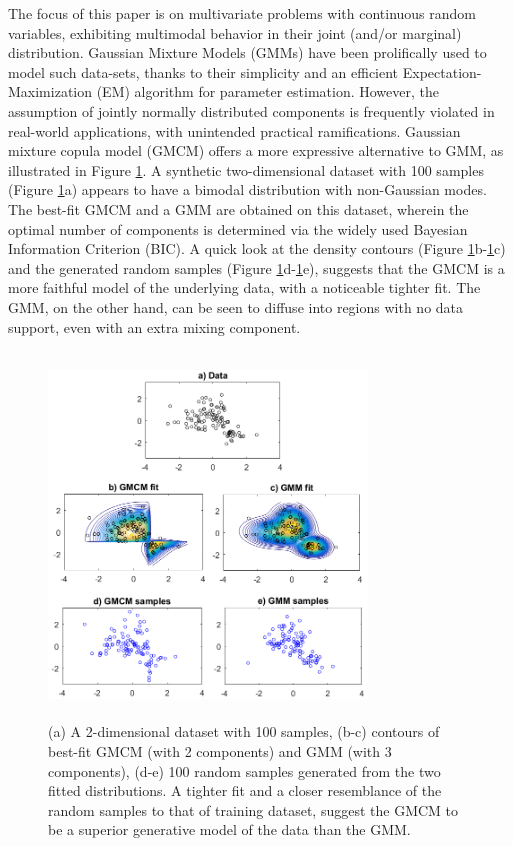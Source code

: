 \documentclass{article}
\theoremstyle{plain}
\theoremstyle{definition}
\theoremstyle{remark}
\begin{document}
The focus of this paper is on multivariate problems with continuous random variables, exhibiting multimodal behavior in their  joint (and/or marginal) distribution. Gaussian Mixture Models (GMMs) \citep{Bilmes98agentle} have been prolifically used to model such data-sets, thanks to their simplicity and an efficient Expectation-Maximization (EM) algorithm for parameter estimation. However, the assumption of jointly normally distributed components is frequently violated in real-world applications, with unintended practical ramifications. Gaussian mixture copula model (GMCM) \citep{Tewari2011,Bilgrau2016,Bhattacharya2014} offers a more expressive alternative to GMM, as illustrated in Figure \ref{fig:motivating_example_gmcm}. A synthetic two-dimensional dataset with 100 samples (Figure \ref{fig:motivating_example_gmcm}a) appears to have a bimodal distribution with non-Gaussian modes. The best-fit GMCM and a GMM are obtained on this dataset, wherein the optimal number of components is determined via the widely used Bayesian Information Criterion (BIC). A quick look at the density contours (Figure \ref{fig:motivating_example_gmcm}b-\ref{fig:motivating_example_gmcm}c) and the generated random samples (Figure \ref{fig:motivating_example_gmcm}d-\ref{fig:motivating_example_gmcm}e), suggests that the GMCM is a more faithful model of the underlying data, with a noticeable tighter fit. The GMM, on the other hand, can be seen to diffuse into regions with no data support, even with an extra mixing component.

\begin{figure}[ht]
\centering
\includegraphics[width= 240pt,height=275pt]{figures/figure_for_motivating_gmcm}
\caption{(a) A 2-dimensional dataset with 100 samples, (b-c) contours of best-fit GMCM (with 2 components) and GMM (with 3 components), (d-e) 100 random samples generated from the two fitted distributions. A tighter fit and a closer resemblance of the random samples to that of training dataset, suggest the GMCM to be a superior generative model of the data than the GMM.}
\label{fig:motivating_example_gmcm}
\end{figure}
\end{document}
